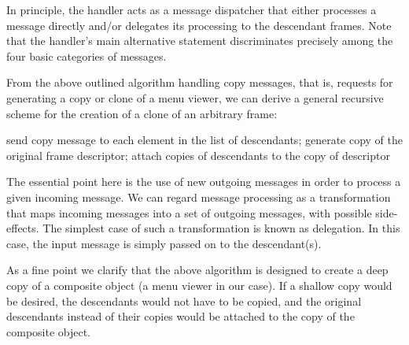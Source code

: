 In principle, the handler acts as a message dispatcher that either processes a message directly
and/or delegates its processing to the descendant frames. Note that the handler's main alternative
statement discriminates precisely among the four basic categories of messages.

From the above outlined algorithm handling copy messages, that is, requests for generating a
copy or clone of a menu viewer, we can derive a general recursive scheme for the creation of a
clone of an arbitrary frame:

send copy message to each element in the list of descendants;
generate copy of the original frame descriptor;
attach copies of descendants to the copy of descriptor

The essential point here is the use of new outgoing messages in order to process a given
incoming message. We can regard message processing as a transformation that maps incoming
messages into a set of outgoing messages, with possible side-effects. The simplest case of such
a transformation is known as delegation. In this case, the input message is simply passed on to
the descendant(s).

As a fine point we clarify that the above algorithm is designed to create a deep copy of a
composite object (a menu viewer in our case). If a shallow copy would be desired, the
descendants would not have to be copied, and the original descendants instead of their copies
would be attached to the copy of the composite object.

